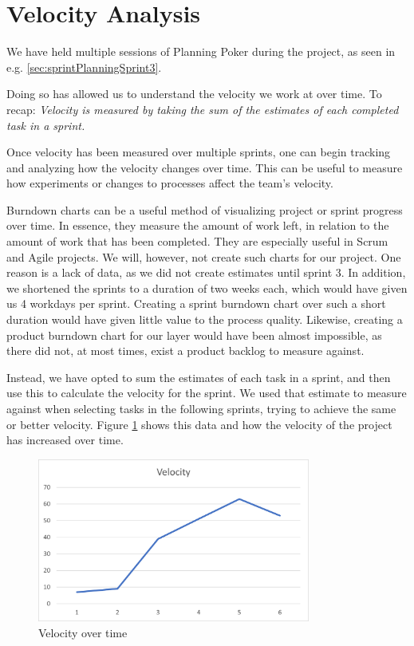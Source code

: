 \section{Velocity Analysis}\label{sec:velocityAnalysis}
We have held multiple sessions of Planning Poker during the project, as seen in e.g. \ref{sec:sprintPlanningSprint3}.

Doing so has allowed us to understand the velocity we work at over time. To recap: \textit{Velocity is measured by taking the sum of the estimates of each completed task in a sprint\cite{sutherlandScrumArtDoing2014}.}

Once velocity has been measured over multiple sprints, one can begin tracking and analyzing how the velocity changes over time. This can be useful to measure how experiments or changes to processes affect the team's velocity.

Burndown charts can be a useful method of visualizing project or sprint progress over time. In essence, they measure the amount of work left, in relation to the amount of work that has been completed. They are especially useful in Scrum and Agile projects\cite{HowCreateBurndown2021}. We will, however, not create such charts for our project. One reason is a lack of data, as we did not create estimates until sprint 3.
In addition, we shortened the sprints to a duration of two weeks each, which would have given us 4 workdays per sprint. Creating a sprint burndown chart over such a short duration would have given little value to the process quality.
Likewise, creating a product burndown chart for our layer would have been almost impossible, as there did not, at most times, exist a product backlog to measure against.

Instead, we have opted to sum the estimates of each task in a sprint, and then use this to calculate the velocity for the sprint. We used that estimate to measure against when selecting tasks in the following sprints, trying to achieve the same or better velocity. Figure \ref{img:velocityOverTime} shows this data and how the velocity of the project has increased over time.

\begin{figure}[h!]
\centering
\includegraphics[width=0.8\textwidth]{Images/VelocityAnalysis.png}
\caption{Velocity over time}
\label{img:velocityOverTime}
\end{figure}

